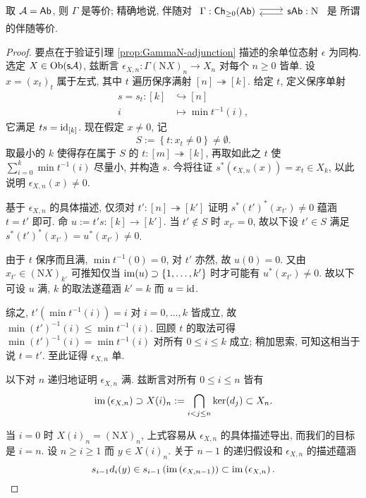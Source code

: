 \begin{lemma}\label{prop:DK-Ab}
	取 $\mathcal{A} = \mathsf{Ab}$, 则 $\Gamma$ 是等价; 精确地说, 伴随对
	$\begin{tikzcd}
		\Gamma: \cate{Ch}_{\geq 0}(\cate{Ab}) \arrow[shift left, r] & \cate{s}\cate{Ab} : \mathrm{N} \arrow[shift left, l]
	\end{tikzcd}$
	是 \cite[定理 2.6.12]{Li1} 所谓的伴随等价.
\end{lemma}
\begin{proof}
	要点在于验证引理 \ref{prop:GammaN-adjunction} 描述的余单位态射 $\epsilon$ 为同构. 选定 $X \in \operatorname{Ob}(\mathsf{s}\mathcal{A})$, 兹断言 $\epsilon_{X, n}: \Gamma (\mathrm{N}X)_n \to X_n$ 对每个 $n \geq 0$ 皆单. 设 $x = (x_t)_t$ 属于左式, 其中 $t$ 遍历保序满射 $[n] \twoheadrightarrow [k]$. 给定 $t$, 定义保序单射
	\begin{align*}
		s = s_t : [k] & \hookrightarrow [n] \\
		i & \mapsto \min t^{-1}(i) ,
	\end{align*}
	它满足 $ts = \mathrm{id}_{[k]}$. 现在假定 $x \neq 0$, 记
	\[ S := \left\{t: x_t \neq 0 \right\} \neq \emptyset. \]
	取最小的 $k$ 使得存在属于 $S$ 的 $t: [m] \twoheadrightarrow [k]$, 再取如此之 $t$ 使 $\sum_{i=0}^k \min t^{-1}(i)$ 尽量小, 并构造 $s$. 今将往证 $s^*(\epsilon_{X, n}(x)) = x_t \in X_k$, 以此说明 $\epsilon_{X, n}(x) \neq 0$.
	
	基于 $\epsilon_{X, n}$ 的具体描述, 仅须对 $t': [n] \twoheadrightarrow [k']$ 证明 $s^* (t')^*(x_{t'}) \neq 0$ 蕴涵 $t = t'$ 即可. 命 $u := t's: [k] \to [k']$. 当 $t' \notin S$ 时 $x_{t'} = 0$, 故以下设 $t' \in S$ 满足 $s^* (t')^*(x_{t'}) = u^* (x_{t'}) \neq 0$.
	
	由于 $t$ 保序而且满, $\min t^{-1}(0) = 0$, 对 $t'$ 亦然, 故 $u(0) = 0$. 又由 $x_{t'} \in (\mathrm{N}X)_{k'}$ 可推知仅当 $\operatorname{im}(u) \supset \{1, \ldots, k'\}$ 时才可能有 $u^* (x_{t'}) \neq 0$. 故以下可设 $u$ 满, $k$ 的取法遂蕴涵 $k' = k$ 而 $u = \mathrm{id}$.
	
	综之, $t'\left( \min t^{-1}(i) \right) = i$ 对 $i = 0, \ldots, k$ 皆成立, 故 $\min (t')^{-1}(i) \leq \min t^{-1}(i)$. 回顾 $t$ 的取法可得 $\min (t')^{-1}(i) = \min t^{-1}(i)$ 对所有 $0 \leq i \leq k$ 成立; 稍加思索, 可知这相当于说 $t = t'$. 至此证得 $\epsilon_{X, n}$ 单.
	
	以下对 $n$ 递归地证明 $\epsilon_{X, n}$ 满. 兹断言对所有 $0 \leq i \leq n$ 皆有
	\[ \operatorname{im}\left( \epsilon_{X, n} \right) \supset X(i)_n := \bigcap_{i < j \leq n} \operatorname{ker}(d_j) \subset X_n. \]
	
	当 $i = 0$ 时 $X(i)_n = (\mathrm{N}X)_n$, 上式容易从 $\epsilon_{X, n}$ 的具体描述导出, 而我们的目标是 $i=n$. 设 $n \geq i \geq 1$ 而 $y \in X(i)_n$. 关于 $n-1$ 的递归假设和 $\epsilon_{X, n}$ 的描述蕴涵
	\[ s_{i-1} d_i(y) \in s_{i-1}\left( \operatorname{im}\left(\epsilon_{X, n-1}\right) \right) \subset \operatorname{im}\left( \epsilon_{X, n} \right). \]


\end{proof}
